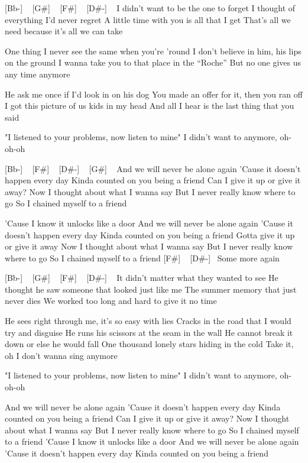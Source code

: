 
[Bb-] ~ [G#] ~ [F#] ~ [D#-] ~
I didn't want to be the one to forget
I thought of everything I'd never regret
A little time with you is all that I get
That's all we need because it's all we can take

One thing I never see the same when you're 'round
I don’t believe in him, his lips on the ground
I wanna take you to that place in the “Roche”
But no one gives us any time anymore

He ask me once if I’d look in on his dog
You made an offer for it, then you ran off
I got this picture of us kids in my head
And all I hear is the last thing that you said

"I listened to your problems, now listen to mine"
I didn't want to anymore, oh-oh-oh

[Bb-] ~ [F#] ~ [D#-] ~ [G#] ~
And we will never be alone again
'Cause it doesn't happen every day
Kinda counted on you being a friend
Can I give it up or give it away?
Now I thought about what I wanna say
But I never really know where to go
So I chained myself to a friend

'Cause I know it unlocks like a door
And we will never be alone again
'Cause it doesn't happen every day
Kinda counted on you being a friend
Gotta give it up or give it away
Now I thought about what I wanna say
But I never really know where to go
So I chained myself to a friend
[F#] ~ [D#-]~
Some more again

[Bb-] ~ [G#] ~ [F#] ~ [D#-] ~
It didn't matter what they wanted to see
He thought he saw someone that looked just like me
The summer memory that just never dies
We worked too long and hard to give it no time

He sees right through me, it's so easy with lies
Cracks in the road that I would try and disguise
He runs his scissors at the seam in the wall
He cannot break it down or else he would fall
One thousand lonely stars hiding in the cold
Take it, oh I don't wanna sing anymore

"I listened to your problems, now listen to mine"
I didn't want to anymore, oh-oh-oh

And we will never be alone again
'Cause it doesn't happen every day
Kinda counted on you being a friend
Can I give it up or give it away?
Now I thought about what I wanna say
But I never really know where to go
So I chained myself to a friend
'Cause I know it unlocks like a door
And we will never be alone again
'Cause it doesn't happen every day
Kinda counted on you being a friend

